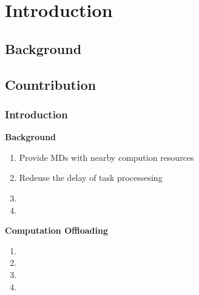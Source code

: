 \section{Introduction}

\subsection{Background} 
\subsection{Countribution} 


\begin{frame}
\frametitle{Introduction}

\textbf{Background} 

\begin{enumerate}[]

	
	\item{Provide MDs with nearby compution resources} 
	
	\item{Redeuse the delay of task processesing}
	
	\item{}
	
	\item{}
	
\end{enumerate}

\textbf{Computation Offloading} 

\begin{enumerate}[]
	
	\item{} 
	
	\item{}
	
	\item{}
	
	\item{}
	
\end{enumerate}

\end{frame}